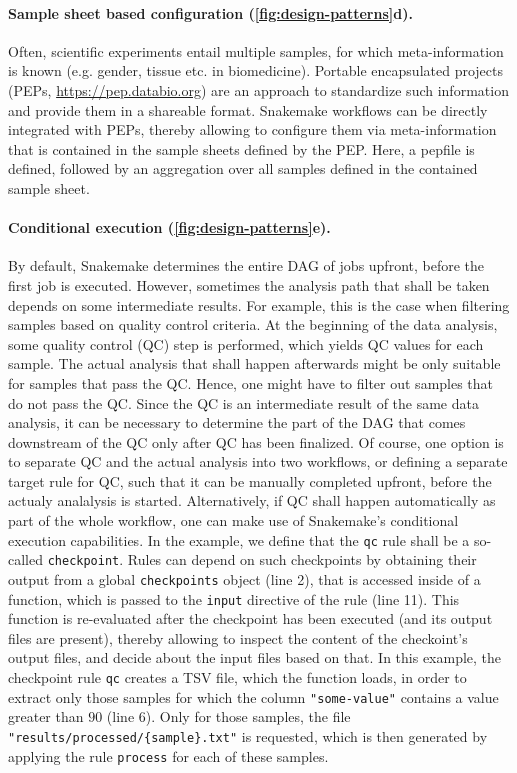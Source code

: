 \documentclass{scrartcl}
\let\plainurl\url
\renewcommand{\url}[1]{\protect\plainurl{#1}}
\begin{document}
\paragraph{Sample sheet based configuration (\autoref{fig:design-patterns}d).}
Often, scientific experiments entail multiple samples, for which meta-information is known (e.g. gender, tissue etc. in biomedicine).
Portable encapsulated projects (PEPs, \url{https://pep.databio.org}) are an approach to standardize such information and provide them in a shareable format.
Snakemake workflows can be directly integrated with PEPs, thereby allowing to configure them via meta-information that is contained in the sample sheets defined by the PEP.
Here, a pepfile is defined, followed by an aggregation over all samples defined in the contained sample sheet.

\paragraph{Conditional execution (\autoref{fig:design-patterns}e).}
By default, Snakemake determines the entire DAG of jobs upfront, before the first job is executed.
However, sometimes the analysis path that shall be taken depends on some intermediate results.
For example, this is the case when filtering samples based on quality control criteria.
At the beginning of the data analysis, some quality control (QC) step is performed, which yields QC values for each sample.
The actual analysis that shall happen afterwards might be only suitable for samples that pass the QC.
Hence, one might have to filter out samples that do not pass the QC.
Since the QC is an intermediate result of the same data analysis, it can be necessary to determine the part of the DAG that comes downstream of the QC only after QC has been finalized.
Of course, one option is to separate QC and the actual analysis into two workflows, or defining a separate target rule for QC, such that it can be manually completed upfront, before the actualy analalysis is started.
Alternatively, if QC shall happen automatically as part of the whole workflow, one can make use of Snakemake's conditional execution capabilities.
In the example, we define that the \lstinline!qc! rule shall be a so-called \lstinline!checkpoint!.
Rules can depend on such checkpoints by obtaining their output from a global \lstinline!checkpoints! object (line 2), that is accessed inside of a function, which is passed to the \lstinline!input! directive of the rule (line 11).
This function is re-evaluated after the checkpoint has been executed (and its output files are present), thereby allowing to inspect the content of the checkoint's output files, and decide about the input files based on that.
In this example, the checkpoint rule \lstinline!qc! creates a TSV file, which the function loads, in order to extract only those samples for which the column \lstinline!"some-value"! contains a value greater than $90$ (line 6).
Only for those samples, the file \lstinline!"results/processed/{sample}.txt"! is requested, which is then generated by applying the rule \lstinline!process! for each of these samples.
\end{document}
